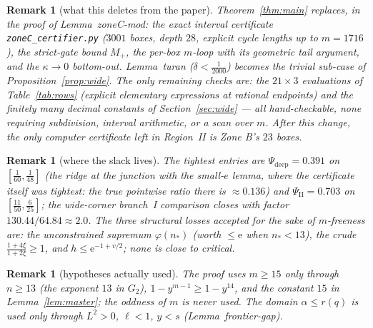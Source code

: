 \documentclass[11pt]{amsart}
\newtheorem{remark}[theorem]{Remark}
\newcommand{\eu}{\mathrm{e}}
\begin{document}
\begin{remark}[what this deletes from the paper]
Theorem~\ref{thm:main} replaces, in the proof of Lemma~\emph{zoneC-mod}:
the exact interval certificate \texttt{zoneC\_certifier.py} ($3001$ boxes,
depth $28$, explicit cycle lengths up to $m=1716$), the strict-gate bound
$M_+$, the per-box $m$-loop with its geometric tail argument, and the
$\kappa\to0$ bottom-out.  Lemma~\emph{turan} ($\delta<\tfrac1{2000}$)
becomes the trivial sub-case of Proposition~\ref{prop:wide}.  The only
remaining checks are: the $21\times3$ evaluations of Table~\ref{tab:rows}
(explicit elementary expressions at rational endpoints) and the
finitely many decimal constants of Section~\ref{sec:wide} — all
hand-checkable, none requiring subdivision, interval arithmetic, or a scan
over $m$.  After this change, the only computer certificate left in
Region~II is Zone B's $23$ boxes.
\end{remark}

\begin{remark}[where the slack lives]
The tightest entries are $\Psi_{\mathrm{deep}}=0.391$ on
$[\tfrac1{60},\tfrac1{48}]$ (the ridge at the junction with the small-$e$
lemma, where the certificate itself was tightest: the true pointwise ratio
there is $\approx0.136$) and $\Psi_{\mathrm{II}}=0.703$ on
$[\tfrac{11}{50},\tfrac6{25}]$; the wide-corner branch~I comparison closes
with factor $130.44/64.84\approx2.0$.  The three structural losses
accepted for the sake of $m$-freeness are: the unconstrained supremum
$\varphi(n_*)$ (worth $\le\eu$ when $n_*<13$), the crude
$\tfrac{1+4\xi}{1+2\xi}\ge1$, and $h\le\eu^{-1+v/2}$; none is close to
critical.
\end{remark}

\begin{remark}[hypotheses actually used]
The proof uses $m\ge15$ only through $n\ge13$ (the exponent $13$ in $G_2$),
$1-y^{m-1}\ge1-y^{14}$, and the constant $15$ in
Lemma~\ref{lem:master}; the oddness of $m$ is never used.  The domain
$\alpha\le r(q)$ is used only through $L^2>0$, $\ell<1$, $y<s$
(Lemma~\emph{frontier-gap}).
\end{remark}
\end{document}

